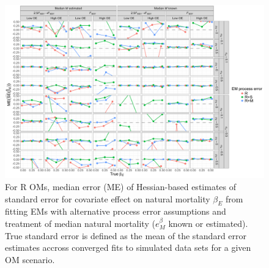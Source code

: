 \documentclass[
  12pt,
]{article}
\begin{document}
\begin{landscape}
\begin{figure}
\begin{center}
\includegraphics[height = \textheight]{se_beta_E_bias_Rom}
\end{center}
\caption{For R OMs, median error (ME) of Hessian-based estimates of standard error for covariate effect on natural mortality $\beta_E$ from fitting EMs with alternative process error assumptions and treatment of median natural mortality ($e^\beta_M$ known or estimated). True standard error is defined as the mean of the standard error estimates accross converged fits to simulated data sets for a given OM scenario.}\label{se_beta_E_bias_Rom}
\end{figure}
\end{landscape}
\end{document}
